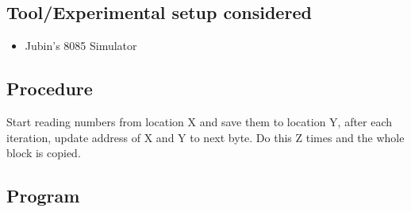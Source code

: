 \documentclass[a4paper]{article} %
\begin{document}
    \subsection{Tool/Experimental setup considered}
        \begin{itemize}
            \item Jubin's 8085 Simulator
        \end{itemize}
    \subsection{Procedure}
        Start reading numbers from location X and save them to location Y, after each iteration, update address of X and Y to next byte. Do this Z times and the whole block is copied.
    \subsection{Program}
        
        \newpage
\end{document}

